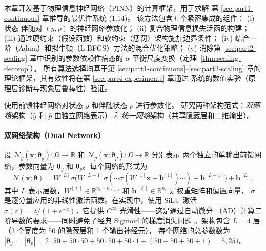 \documentclass{xmu}
\theoremstyle{plain}
\theoremstyle{remark}
\begin{document}
\label{sec:part3-pinn}

本章开发基于物理信息神经网络（PINN）的计算框架，用于求解
第 \ref{sec:part1-continuous} 章推导的最优性系统 (1.14)。
该方法包含五个紧密集成的组件：
(i) 状态-伴随对 $(\bar y, \bar p)$ 的神经网络参数化；
(ii) 复合物理信息损失泛函的构建；
(iii) 通过硬约束（假设函数）和软约束（惩罚）架构施加边界条件；
(iv) 结合一阶（Adam）和拟牛顿（L-BFGS）方法的混合优化策略；
(v) 消除第 \ref{sec:part2-scaling} 章中识别的参数依赖性病态的
$\alpha$-平衡尺度变换（定理~\ref{thm:scaling-decomp}）。
所有算法选择均基于第 \ref{sec:part1-continuous}--\ref{sec:part2-scaling}
章的理论框架，其有效性将在第 \ref{sec:part4-experiments} 章通过
系统的数值实验（原理层诊断与现象层鲁棒性）验证。


\label{subsec:pinn-arch}

使用前馈神经网络对状态 $\bar y$ 和伴随状态 $\bar p$ 进行参数化。
研究两种架构范式：\emph{双网络}架构（$\bar y$ 和 $\bar p$ 由独立网络表示）
和\emph{统一网络}架构（共享隐藏层和二维输出）。

\paragraph{双网络架构（Dual Network）}
设 $\mathcal{N}_y(\mathbf{x};\boldsymbol{\theta}_y):\Omega\to\mathbb{R}$ 和
$\mathcal{N}_p(\mathbf{x};\boldsymbol{\theta}_p):\Omega\to\mathbb{R}$ 分别表示
两个独立的单输出前馈网络，参数向量为 $\boldsymbol{\theta}_y$ 和
$\boldsymbol{\theta}_p$。每个网络的形式为
\begin{equation}
\mathcal{N}(\mathbf{x};\boldsymbol{\theta})
= W^{[L]}\sigma\bigl(W^{[L-1]}\sigma(\cdots\sigma(W^{[1]}\mathbf{x}+\mathbf{b}^{[1]})\cdots)+\mathbf{b}^{[L-1]}\bigr)+\mathbf{b}^{[L]},
\end{equation}
其中 $L$ 表示层数，$W^{[\ell]}\in\mathbb{R}^{n_\ell\times n_{\ell-1}}$ 和
$\mathbf{b}^{[\ell]}\in\mathbb{R}^{n_\ell}$ 是权重矩阵和偏置向量，
$\sigma$ 是逐分量应用的非线性激活函数。在实现中，使用 SiLU 激活\cite{31}
$\sigma(z)=z/(1+e^{-z})$，它提供 $C^\infty$ 光滑性——这是通过自动微分
（AD）计算二阶导数的要求——同时避免了经典 Sigmoid \cite{31}的梯度消失问题
\cite{21}。架构包含 $L=4$ 层（3 个宽度为 50 的隐藏层和 1 个输出神经元），
每个网络的总参数数为 $|\boldsymbol{\theta}_y|=|\boldsymbol{\theta}_p|
=2\cdot 50+50\cdot 50+50\cdot 50+50\cdot 1+(50+50+50+1)=5{,}251$。
\end{document}
